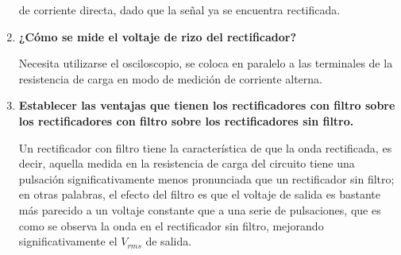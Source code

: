 \documentclass[12pt]{article}
\begin{document}
\begin{enumerate}
                de corriente directa, dado que la señal ya se encuentra rectificada.
            \item \textbf{¿Cómo se mide el voltaje de rizo del rectificador?}\par
                Necesita utilizarse el osciloscopio, se coloca en paralelo a las terminales de la resistencia de carga en modo de medición de corriente alterna.
            \item \textbf{Establecer las ventajas que tienen los rectificadores con filtro sobre los rectificadores con filtro sobre los rectificadores sin filtro.}\par    
                Un rectificador con filtro tiene la característica de que la onda rectificada, es decir, aquella medida en la resistencia de carga del circuito tiene una pulsación significativamente menos 
                pronunciada que un rectificador sin filtro; en otras palabras, el efecto del filtro es que el voltaje de salida es bastante más parecido a un voltaje constante que a una serie de pulsaciones, que 
                es como se observa la onda en el rectificador sin filtro, mejorando significativamente el $V_{rms}$ de salida.
        \end{enumerate}
\end{document}
